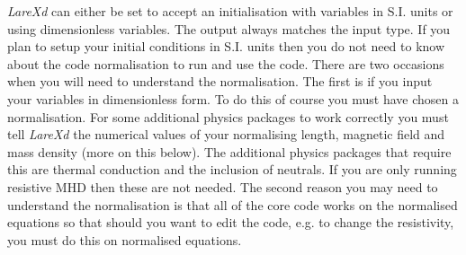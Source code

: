 \documentclass[11pt]{article}
\begin{document}
 {\it LareXd} can either be set to accept an initialisation with variables in S.I. units or using dimensionless variables. The output always matches the input type. If you plan to setup your initial conditions in S.I. units then you do not need to know about the code normalisation to run and use the code. There are two occasions when you will need to understand the normalisation. The first is if you input your variables in dimensionless form. To do this of course you must have chosen a normalisation. For some additional physics packages to work correctly you must tell {\it LareXd} the numerical values of your normalising length, magnetic field and mass density (more on this below). The additional physics packages that require this are thermal conduction and the inclusion of neutrals. If you are only running resistive MHD then these are not needed. The second reason you may need to understand the normalisation is that all of the core code works on the normalised equations so that should you want to edit the code, e.g. to change the resistivity, you must do this on normalised equations.  
 
\end{document}
